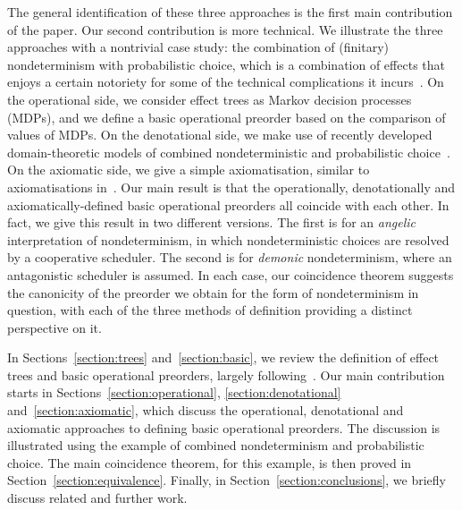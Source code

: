 The general identification of these three approaches is the first main contribution of the paper.
Our second contribution is more technical. We illustrate the three approaches
with a nontrivial case study: the combination of (finitary) nondeterminism with probabilistic choice, which is a combination of effects that enjoys a certain notoriety 
for some of the technical complications it incurs~\cite{Mislove2000,mislove2004axioms,VW06,tix2009semantic,JGL15,JGL-mscs16,KeimelP2016}.
On the operational side, we consider effect trees as Markov decision processes (MDPs), and we define a basic operational preorder based on the comparison of values of MDPs. On the denotational side, we make use of recently developed domain-theoretic models of combined nondeterministic and probabilistic choice~\cite{tix2009semantic,JGL-mscs16,KeimelP2016}.
On the axiomatic side, we give a simple axiomatisation, similar to axiomatisations in~\cite{mislove2004axioms,KeimelP2016}. 
Our main result is that the
operationally, denotationally and axiomatically-defined basic operational preorders all coincide with each other.
In fact, we give this result in two different versions.
The first is for an \emph{angelic} interpretation of nondeterminism, in which nondeterministic choices are resolved by a cooperative scheduler. The second is for \emph{demonic} nondeterminism, where an antagonistic scheduler is assumed. 
In each case, our coincidence theorem suggests the canonicity of the  preorder we obtain for the form of nondeterminism in question, with each of the three methods of definition providing a distinct perspective on it. 

In Sections~\ref{section:trees} and~\ref{section:basic}, we review the 
definition of effect trees and basic operational preorders, largely following~\cite{gom}. Our main contribution starts in Sections~\ref{section:operational}, \ref{section:denotational} and~\ref{section:axiomatic}, which discuss the 
operational, denotational and axiomatic approaches to defining basic operational preorders. The discussion is illustrated using the example of combined nondeterminism and probabilistic choice. 
The main coincidence theorem, for this example, is then proved in Section~\ref{section:equivalence}. Finally, in Section~\ref{section:conclusions}, we briefly discuss related and further work.






